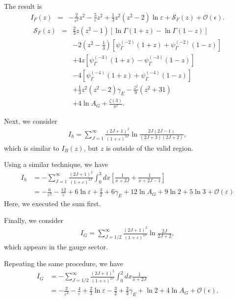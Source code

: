 \documentclass[12pt]{article}
\begin{document}
The result is
\begin{eqnarray}
 I_F(z)& = &-\frac{2}{\varepsilon^2}z^2-\frac{5}{\varepsilon}z^2
 +\frac{1}{3}z^2(z^2-2)\ln\varepsilon+\mathcal S_F(z)+\mathcal{O}(\epsilon).
\end{eqnarray}
\begin{eqnarray}
 \mathcal S_F(z)& = &\frac{2}{3}z(z^2-1)
 \left[
  \ln\Gamma(1+z)-\ln\Gamma(1-z)
 \right]\nonumber\\
 &&-2
 \left(
  z^2-\frac{1}{3}
 \right)\left[\psi_{\Gamma}^{(-2)}(1+z)+\psi_{\Gamma}^{(-2)}(1-z)
 \right]\nonumber\\
 &&+4z[\psi_{\Gamma}^{(-3)}(1+z)-\psi_{\Gamma}^{(-3)}(1-z)]\nonumber\\
 &&-4[\psi_{\Gamma}^{(-4)}(1+z)+\psi_{\Gamma}^{(-4)}(1-z)]\nonumber\\
 &&+\frac{1}{3}z^2(z^2-2)\gamma_E-\frac{z^2}{9}(z^2+31)\nonumber\\
 &&+4\ln A_G+\frac{\zeta(3)}{\pi^2}.
\end{eqnarray}

Next, we consider
\begin{align}
 I_h = \sum_{J=1}^{\infty}\frac{(2J+1)^2}{(1+\varepsilon)^{2J}}
 \ln\frac{2J(2J-1)}{(2J+3)(2J+2)},
\end{align}
which is similar to $I_B(z)$, but $z$ is outside of the valid region.

Using a similar technique, we have
\begin{align}
 I_h & = -\sum_{J=1}^{\infty}\frac{(2J+1)^2}{(1+\varepsilon)^{2J}}\int_0^3dx
 \left[
  \frac{1}{x+2J}+\frac{1}{x+2J-1}
 \right]\nonumber                                                            \\
     & = -\frac{6}{\varepsilon^2}-\frac{12}{\varepsilon}+6\ln\varepsilon
 +\frac{3}{2}+6\gamma_E+12\ln A_G+9\ln2+5\ln3+\mathcal O(\varepsilon)
\end{align}
Here, we executed the sum first.

Finally, we consider
\begin{align}
 I_G = \sum_{J=1/2}^{\infty}\frac{(2J+1)^2}{(1+\varepsilon)^{2J}}\ln\frac{2J}{2J+2},
\end{align}
which appears in the gauge sector.

Repeating the same procedure, we have
\begin{align}
 I_G & = -\sum_{J=1/2}^{\infty}
 \frac{(2J+1)^2}{(1+\varepsilon)^{2J}}\int_0^2dx\frac{1}{x+2J}\nonumber           \\
     & = -\frac{2}{\varepsilon^2}-\frac{4}{\varepsilon}+\frac{2}{3}\ln\varepsilon
 -\frac{3}{2}+\frac{2}{3}\gamma_E+\ln2+4\ln A_G+\mathcal{O}(\epsilon).
\end{align}
\end{document}
